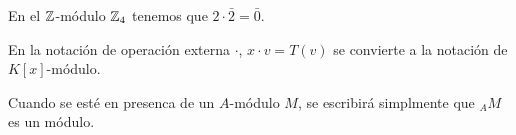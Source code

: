 \begin{ejemplo}
  En el \(\mathbb{Z}\)-módulo \(\mathbb{Z}_4\) tenemos que \(2\cdot \bar{2}=\bar{0}\).
\end{ejemplo}

\begin{obs}
  En la notación de operación externa \(\cdot\), \(x \cdot v = T(v)\) se
  convierte a la notación de \(K[x]\)-módulo.
\end{obs}

\begin{nt}
  Cuando se esté en presenca de un \(A\)-módulo \(M\), se escribirá simplmente que
  \({}_AM\) es un módulo.
\end{nt}

